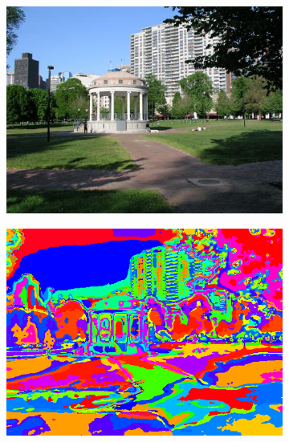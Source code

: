 \documentclass[11pt]{article}
\begin{document}
\begin{figure}[h!]
  \begin{subfigure}{0.4\linewidth}
    \centering
    \includegraphics[width=\textwidth]{../results/labelme_caqoztrngzoasnb_image.png}
  \end{subfigure}
  \begin{subfigure}{0.4\linewidth}
    \centering
    \includegraphics[width=\textwidth]{../results/labelme_caqoztrngzoasnb_wordmap.png}
  \end{subfigure}


\end{figure}
\end{document}
